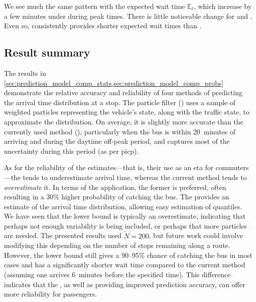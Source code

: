 We see much the same pattern with the expected wait time $\mathbb{E}_\ell$, which increase by a few minutes under \Fpf{} during peak times. There is little noticeable change for \Fsched{} and \Fhist{}. Even so, \Fpf{} consistently provides shorter expected wait times than \Fsched{}.


\subsection{Result summary}
\label{sec:prediction_model_comp_summary}

The results in \cref{sec:prediction_model_comp_stats,sec:prediction_model_comp_probs} demonstrate the relative accuracy and reliability of four methods of predicting the arrival time distribution at a stop. The particle filter (\Fpf{}) uses a sample of weighted particles representing the vehicle's state, along with the \rt{} traffic state, to approximate the distribution. On average, it is slightly more accurate than the currently used method (\Fsched{}), particularly when the bus is within 20~minutes of arriving and during the daytime off-peak period, and captures most of the uncertainty during this period (as per \gls{picp}).

As for the reliability of the estimates---that is, their use as an \gls{eta} for commuters---the \pf{} tends to underestimate arrival time, whereas the current method tends to \emph{overestimate} it. In terms of the application, the former is preferred, often resulting in a 30\% higher probability of catching the bus. The \pf{} provides an estimate of the arrival time distribution, allowing easy estimation of quantiles. We have seen that the lower bound is typically an overestimate, indicating that perhaps not enough variability is being included, or perhaps that more particles are needed. The presented results used $\tilde N = 200$, but future work could involve modifying this depending on the number of stops remaining along a route. However, the lower bound still gives a 90--95\% chance of catching the bus in most cases and has a significantly shorter wait time compared to the current method (assuming one arrives 6~minutes before the specified time). This difference indicates that the \pf{}, as well as providing improved prediction accuracy, can offer more reliability for passengers.


